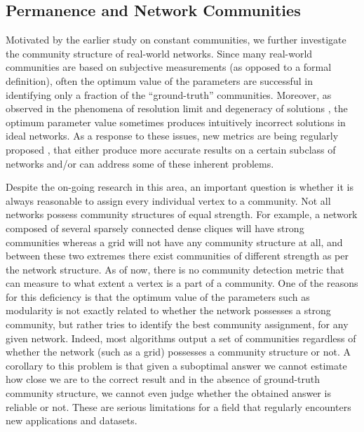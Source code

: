  

\subsection{Permanence and Network Communities}
Motivated by  the earlier study on constant communities, we further investigate the community structure of real-world networks. Since many
real-world communities are
based on subjective measurements (as opposed to a formal definition), often the optimum value of the parameters are successful in
identifying only a fraction of the ``ground-truth'' communities. Moreover, as observed in the phenomena of resolution limit
\cite{Fortunato:2007} and degeneracy of solutions \cite{gmc2010}, the optimum parameter value sometimes produces intuitively incorrect
solutions in ideal networks. As a response to these issues, new metrics are being regularly proposed \cite{Dongxiao, Yang:2012}, that either
produce more accurate results on a certain subclass of networks and/or can address some of these inherent problems.

Despite the on-going research in this area, an important question is whether it is always reasonable to assign every individual vertex to a
community. Not all networks possess community structures of equal strength. For example, a network composed of several sparsely connected
dense cliques will have strong communities whereas a grid will not have any community structure at all, and between these two extremes there
exist communities of different strength as per the network structure. As of now, there is no community detection metric that can measure to
what extent a vertex is a part of a community. One of the reasons for this deficiency is that the optimum value of the parameters such as
modularity is not  exactly related to whether the network possesses a strong community, but rather tries to identify the best community
assignment, for any given network.  Indeed, most algorithms output a set of communities regardless of whether the network (such as a
grid) possesses a community structure or not.  A corollary to this problem is that given a suboptimal answer we cannot estimate how close we
are to the correct result and in the absence of ground-truth community structure, we cannot even judge whether the obtained answer is
reliable or not. These are serious limitations for a field that regularly encounters new applications and datasets.

